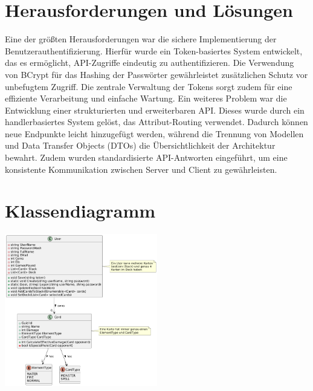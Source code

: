 \documentclass{article}
\begin{document}
\section{Herausforderungen und Lösungen}
Eine der größten Herausforderungen war die sichere Implementierung der Benutzerauthentifizierung. Hierfür wurde ein Token-basiertes System entwickelt, das es ermöglicht, API-Zugriffe eindeutig zu authentifizieren. Die Verwendung von BCrypt für das Hashing der Passwörter gewährleistet zusätzlichen Schutz vor unbefugtem Zugriff. Die zentrale Verwaltung der Tokens sorgt zudem für eine effiziente Verarbeitung und einfache Wartung.
Ein weiteres Problem war die Entwicklung einer strukturierten und erweiterbaren API. Dieses wurde durch ein handlerbasiertes System gelöst, das Attribut-Routing verwendet. Dadurch können neue Endpunkte leicht hinzugefügt werden, während die Trennung von Modellen und Data Transfer Objects (DTOs) die Übersichtlichkeit der Architektur bewahrt. Zudem wurden standardisierte API-Antworten eingeführt, um eine konsistente Kommunikation zwischen Server und Client zu gewährleisten.

\section{Klassendiagramm}
\begin{center}
    \includegraphics[width=0.5\textwidth]{UML.png}
    \label{fig:uml}
\end{center}
\end{document}

